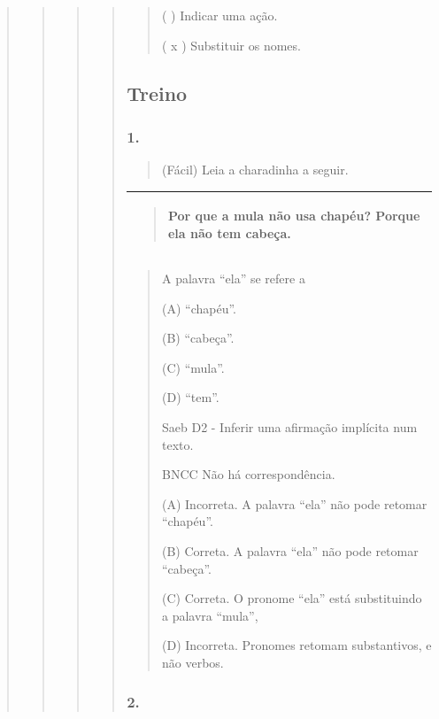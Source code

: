 \begin{quote}
\begin{quote}
\begin{quote}
\begin{quote}
\begin{quote}
( ) Indicar uma ação.

( x ) Substituir os nomes.
\end{quote}

\subsection{Treino}\label{treino-9}

\subsubsection{1.}\label{section-77}

\begin{quote}
(Fácil) Leia a charadinha a seguir.
\end{quote}

\begin{longtable}[]{@{}l@{}}
\toprule
\begin{minipage}[t]{0.97\columnwidth}\raggedright\strut
\begin{quote}
Por que a mula não usa chapéu? Porque ela não tem cabeça.
\end{quote}\strut
\end{minipage}\tabularnewline
\bottomrule
\end{longtable}

\begin{quote}
A palavra ``ela'' se refere a

(A) ``chapéu''.

(B) ``cabeça''.

(C) ``mula''.

(D) ``tem''.

Saeb D2 - Inferir uma afirmação implícita num texto.

BNCC Não há correspondência.

(A) Incorreta. A palavra ``ela'' não pode retomar ``chapéu''.

(B) Correta. A palavra ``ela'' não pode retomar ``cabeça''.

(C) Correta. O pronome ``ela'' está substituindo a palavra ``mula'',

(D) Incorreta. Pronomes retomam substantivos, e não verbos.
\end{quote}

\subsubsection{2. }\label{section-78}


\end{quote}
\end{quote}
\end{quote}
\end{quote}
